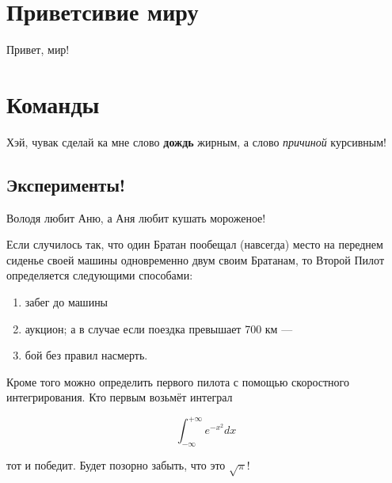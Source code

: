 \documentclass[12pt, a4paper]{article}
\begin{document}



\tableofcontents

\section{Приветсивие миру}
Привет, мир! 

\section{Команды}

Хэй, чувак сделай ка мне слово \textbf{дождь} жирным, а слово \textit{причиной} курсивным!

\subsection{Эксперименты!}

Володя любит          Аню, а Аня любит   кушать мороженое! 

Если случилось так, что один Братан пообещал (навсегда) место на переднем сиденье своей машины одновременно двум своим Братанам, то Второй Пилот определяется следующими способами:



\begin{enumerate}
\item забег до машины
\item аукцион; а в случае если поездка превышает 700 км ---
\item бой без правил насмерть.  %
\end{enumerate}






Кроме того можно определить первого пилота с помощью скоростного интегрирования. Кто первым возьмёт интеграл 

\[ \int_{-\infty}^{+\infty} e^{-x^2} dx \] 

тот и победит. Будет позорно забыть, что это $\sqrt{\pi}$!
\end{document}
